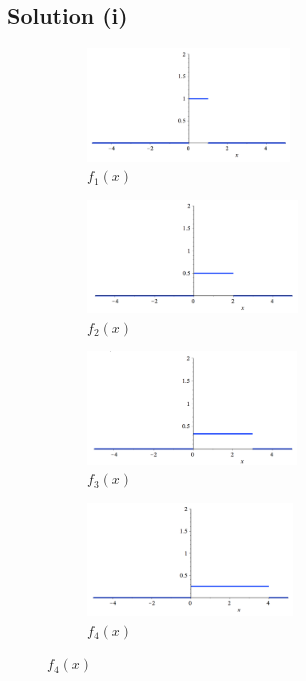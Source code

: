 \documentclass{article}
\begin{document}
\subsection*{Solution (i)}
\vspace{-5mm}
\begin{figure}[H]
 
\begin{subfigure}{0.45\textwidth}
\includegraphics[width=0.9\linewidth, height=3cm]{fig/fk1} 
\caption{$f_1(x)$}
\end{subfigure}
\begin{subfigure}{0.45\textwidth}
\includegraphics[width=0.9\linewidth, height=3cm]{fig/fk2}
\caption{$f_2(x)$}
\end{subfigure}
\begin{subfigure}{0.45\textwidth}
\includegraphics[width=0.9\linewidth, height=3cm]{fig/fk3} 
\caption{$f_3(x)$}
\end{subfigure}
\begin{subfigure}{0.45\textwidth}
\includegraphics[width=0.9\linewidth, height=3cm]{fig/fk4}
\caption{$f_4(x)$}
\end{subfigure}
\end{figure}
\end{document}
